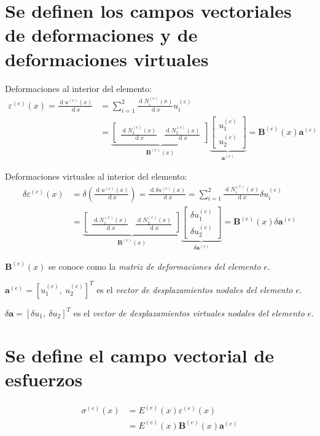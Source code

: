 \documentclass[12pt,landscape,letterpaper]{article}
\newcommand{\ve}[1]{{\boldsymbol{#1}}}
\newcommand{\ma}[1]{{\boldsymbol{#1}}}
\newcommand{\dd}{\operatorname{d} \!}
\begin{document}
\section{Se definen los campos vectoriales de deformaciones y  de deformaciones virtuales}

Deformaciones al interior del elemento:
\begin{align}
\varepsilon^{(e)}(x) = \frac{\dd u^{(e)}(x)}{\dd x} 
&= \sum_{i=1}^2 \frac{\dd N_i^{(e)}(x)}{\dd x} u_i^{(e)} \\
&= 
\underbrace{\begin{bmatrix}
  \frac{\dd N_1^{(e)}(x)}{\dd x} & \frac{\dd N_2^{(e)}(x)}{\dd x}
   \end{bmatrix}}_{\ma{B}^{(e)}(x)}
\underbrace{\begin{bmatrix}
   u_1^{(e)} \\ u_2^{(e)}
   \end{bmatrix}}_{\ma{a}^{(e)}} = \ma{B}^{(e)}(x)  \ve{a}^{(e)}
\end{align}

Deformaciones virtuales al interior del elemento:
\begin{align}
\delta \varepsilon^{(e)}(x) &= \delta \left(\frac{\dd u^{(e)}(x)}{\dd x}\right) = \frac{\dd \delta u^{(e)}(x)}{\dd x} 
= \sum_{i=1}^2 \frac{\dd N_i^{(e)}(x)}{\dd x} \delta u_i^{(e)} \\
&= 
\underbrace{\begin{bmatrix}
   \frac{\dd N_1^{(e)}(x)}{\dd x} & \frac{\dd N_2^{(e)}(x)}{\dd x}
   \end{bmatrix}}_{\ma{B}^{(e)}(x)}
\underbrace{\begin{bmatrix}
  \delta u_1^{(e)} \\ \delta u_2^{(e)}
   \end{bmatrix}}_{\delta \ma{a}^{(e)}} = \ma{B}^{(e)}(x) \delta \ve{a}^{(e)}
\end{align}

$\ma{B}^{(e)}(x)$ se conoce como la \emph{matriz de deformaciones del elemento} $e$.

$\ve{a}^{(e)} = [u_1^{(e)},\ u_2^{(e)}]^T$ es el \emph{vector de desplazamientos nodales del elemento} $e$.

$\delta\ve{a} = [\delta u_1,\ \delta u_2]^T$ es el \emph{vector de desplazamientos virtuales nodales del elemento} $e$.

\newpage
\section{Se define el campo vectorial de esfuerzos}
\begin{align}
\sigma^{(e)}(x) 
&= E^{(e)}(x) \varepsilon^{(e)}(x) \\
&= E^{(e)}(x) \ma{B}^{(e)}(x) \ve{a}^{(e)}
\end{align}
\end{document}
